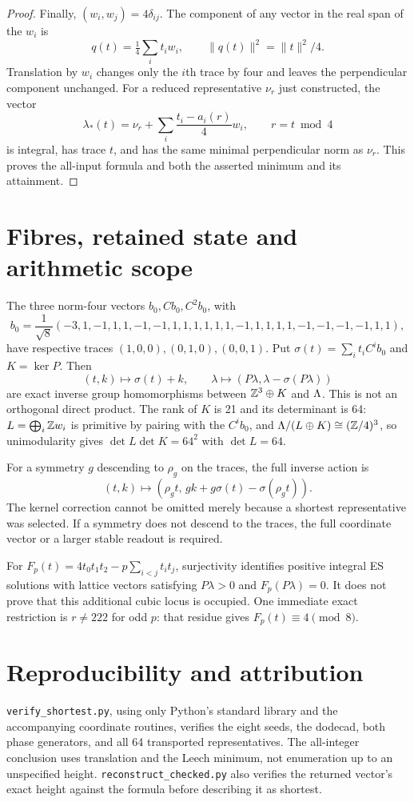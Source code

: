 \begin{proof}
Finally, $(w_i,w_j)=4\delta_{ij}$. The component of any vector in the real span of the $w_i$ is
\[
q(t)=\tfrac14\sum_i t_iw_i,\qquad\|q(t)\|^2=\|t\|^2/4.
\]
Translation by $w_i$ changes only the $i$th trace by four and leaves the perpendicular component unchanged. For a reduced representative $\nu_r$ just constructed, the vector
\[
\boxed{\lambda_*(t)=\nu_r+\sum_i\frac{t_i-a_i(r)}4w_i,\qquad r=t\bmod4}
\]
is integral, has trace $t$, and has the same minimal perpendicular norm as $\nu_r$. This proves the all-input formula and both the asserted minimum and its attainment.
\end{proof}

\section{Fibres, retained state and arithmetic scope}
The three norm-four vectors $b_0,Cb_0,C^2b_0$, with
\[
b_0=\frac1{\sqrt8}(-3,1,-1,1,1,-1,-1,1,1,1,1,1,1,-1,1,1,1,1,-1,-1,-1,-1,1,1),
\]
have respective traces $(1,0,0),(0,1,0),(0,0,1)$. Put $\sigma(t)=\sum_i t_iC^ib_0$ and $K=\ker P$. Then
\[
(t,k)\longmapsto\sigma(t)+k,\qquad
\lambda\longmapsto(P\lambda,\lambda-\sigma(P\lambda))
\]
are exact inverse group homomorphisms between $\mathbb Z^3\oplus K$ and $\Lambda$. This is not an orthogonal direct product. The rank of $K$ is 21 and its determinant is 64: $L=\bigoplus_i\mathbb Z w_i$ is primitive by pairing with the $C^ib_0$, and $\Lambda/(L\oplus K)\cong(\mathbb Z/4)^3$, so unimodularity gives $\det L\det K=64^2$ with $\det L=64$.

For a symmetry $g$ descending to $\rho_g$ on the traces, the full inverse action is
\[
(t,k)\longmapsto(\rho_gt,\,gk+g\sigma(t)-\sigma(\rho_gt)).
\]
The kernel correction cannot be omitted merely because a shortest representative was selected. If a symmetry does not descend to the traces, the full coordinate vector or a larger stable readout is required.

For $F_p(t)=4t_0t_1t_2-p\sum_{i<j}t_it_j$, surjectivity identifies positive integral ES solutions with lattice vectors satisfying $P\lambda>0$ and $F_p(P\lambda)=0$. It does not prove that this additional cubic locus is occupied. One immediate exact restriction is $r\ne222$ for odd $p$: that residue gives $F_p(t)\equiv4\pmod8$.

\section{Reproducibility and attribution}
\texttt{verify\_shortest.py}, using only Python's standard library and the accompanying coordinate routines, verifies the eight seeds, the dodecad, both phase generators, and all 64 transported representatives. The all-integer conclusion uses translation and the Leech minimum, not enumeration up to an unspecified height. \texttt{reconstruct\_checked.py} also verifies the returned vector's exact height against the formula before describing it as shortest.

